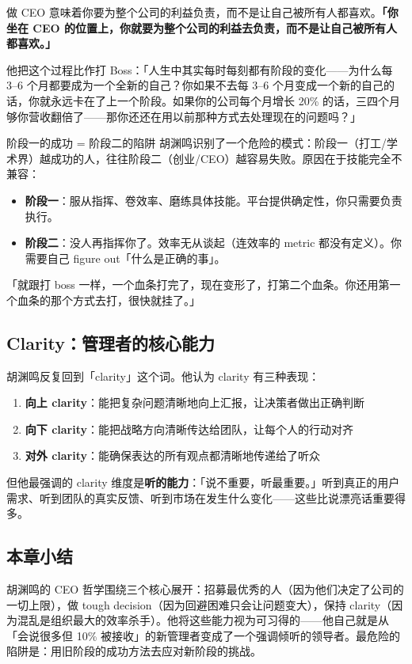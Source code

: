 \documentclass[a4paper]{article}
\begin{document}
做 CEO 意味着你要为整个公司的利益负责，而不是让自己被所有人都喜欢。\textbf{「你坐在 CEO 的位置上，你就要为整个公司的利益去负责，而不是让自己被所有人都喜欢。」}

他把这个过程比作打 Boss：「人生中其实每时每刻都有阶段的变化——为什么每 3--6 个月都要成为一个全新的自己？你如果不去每 3--6 个月变成一个新的自己的话，你就永远卡在了上一个阶段。如果你的公司每个月增长 20\% 的话，三四个月够你营收翻倍了——那你还还在用以前那种方式去处理现在的问题吗？」

\begin{warningbox}{阶段一的成功 = 阶段二的陷阱}
胡渊鸣识别了一个危险的模式：阶段一（打工/学术界）越成功的人，往往阶段二（创业/CEO）越容易失败。原因在于技能完全不兼容：
\begin{itemize}
    \item \textbf{阶段一}：服从指挥、卷效率、磨练具体技能。平台提供确定性，你只需要负责执行。
    \item \textbf{阶段二}：没人再指挥你了。效率无从谈起（连效率的 metric 都没有定义）。你需要自己 figure out「什么是正确的事」。
\end{itemize}
「就跟打 boss 一样，一个血条打完了，现在变形了，打第二个血条。你还用第一个血条的那个方式去打，很快就挂了。」
\end{warningbox}

\subsection{Clarity：管理者的核心能力}

胡渊鸣反复回到「clarity」这个词。他认为 clarity 有三种表现：

\begin{enumerate}
    \item \textbf{向上 clarity}：能把复杂问题清晰地向上汇报，让决策者做出正确判断
    \item \textbf{向下 clarity}：能把战略方向清晰传达给团队，让每个人的行动对齐
    \item \textbf{对外 clarity}：能确保表达的所有观点都清晰地传递给了听众
\end{enumerate}

但他最强调的 clarity 维度是\textbf{听的能力}：「说不重要，听最重要。」听到真正的用户需求、听到团队的真实反馈、听到市场在发生什么变化——这些比说漂亮话重要得多。

\subsection{本章小结}
胡渊鸣的 CEO 哲学围绕三个核心展开：招募最优秀的人（因为他们决定了公司的一切上限），做 tough decision（因为回避困难只会让问题变大），保持 clarity（因为混乱是组织最大的效率杀手）。他将这些能力视为可习得的——他自己就是从「会说很多但 10\% 被接收」的新管理者变成了一个强调倾听的领导者。最危险的陷阱是：用旧阶段的成功方法去应对新阶段的挑战。
\end{document}
